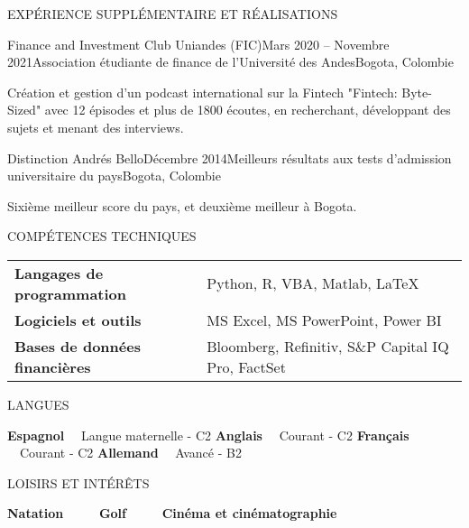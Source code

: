 \documentclass{resume} %
\begin{document}
%
%

\begin{rSection}{EXPÉRIENCE SUPPLÉMENTAIRE ET RÉALISATIONS}

\begin{rSubsection}{Finance and Investment Club Uniandes (FIC)}{Mars 2020 – Novembre 2021}{Association étudiante de finance de l'Université des Andes}{Bogota, Colombie}
    \item Création et gestion d'un podcast international sur la Fintech "Fintech: Byte-Sized" avec 12 épisodes et plus de 1800 écoutes, en recherchant, développant des sujets et menant des interviews.
\end{rSubsection}

\begin{rSubsection}{Distinction Andrés Bello}{Décembre 2014}{Meilleurs résultats aux tests d'admission universitaire du pays}{Bogota, Colombie}
    \item Sixième meilleur score du pays, et deuxième meilleur à Bogota.
\end{rSubsection}

\end{rSection}

%
%

\begin{rSection}{COMPÉTENCES TECHNIQUES}

\begin{tabular}{ @{} >{\bfseries}l @{\hspace{6ex}} l }
Langages de programmation &  Python, R, VBA, Matlab, \LaTeX\\
Logiciels et outils & MS Excel, MS PowerPoint, Power BI \\
Bases de données financières & Bloomberg, Refinitiv, S\&P Capital IQ Pro, FactSet \\
\end{tabular}

\end{rSection}


%
%

\begin{rSection}{LANGUES}

{\bf Espagnol} \ \ {Langue maternelle - C2} \hfill {\bf Anglais} \ \ {Courant - C2} \hfill {\bf Français} \ \ {Courant - C2} \hfill {\bf Allemand} \ \ {Avancé - B2}

\end{rSection}

%
%

\begin{rSection}{LOISIRS ET INTÉRÊTS}

{\bf Natation} \ \ \ \ \ {\bf Golf} \ \ \ \ \ {\bf Cinéma et cinématographie} 

\end{rSection}
\end{document}
